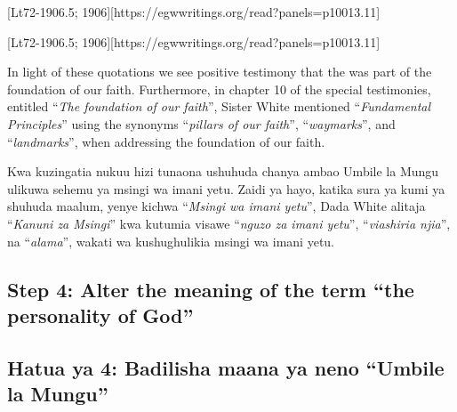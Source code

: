 [Lt72-1906.5; 1906][https://egwwritings.org/read?panels=p10013.11]


[Lt72-1906.5; 1906][https://egwwritings.org/read?panels=p10013.11]


In light of these quotations we see positive testimony that the  was part of the foundation of our faith. Furthermore, in chapter 10 of the special testimonies, entitled “\textit{The foundation of our faith}”, Sister White mentioned “\textit{Fundamental Principles}” using the synonyms “\textit{pillars of our faith}”, “\textit{waymarks}”, and “\textit{landmarks}”, when addressing the foundation of our faith.


Kwa kuzingatia nukuu hizi tunaona ushuhuda chanya ambao Umbile la Mungu ulikuwa sehemu ya msingi wa imani yetu. Zaidi ya hayo, katika sura ya kumi ya shuhuda maalum, yenye kichwa “\textit{Msingi wa imani yetu}”, Dada White alitaja “\textit{Kanuni za Msingi}” kwa kutumia visawe “\textit{nguzo za imani yetu}”, “\textit{viashiria njia}”, na “\textit{alama}”, wakati wa kushughulikia msingi wa imani yetu.


\subsection*{Step 4: Alter the meaning of the term “the personality of God”}


\subsection*{Hatua ya 4: Badilisha maana ya neno “Umbile la Mungu”}


